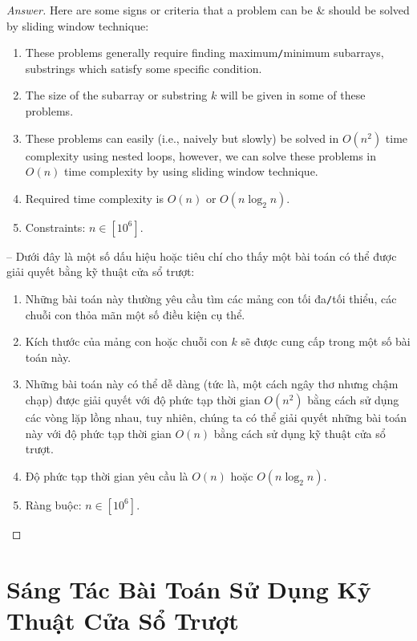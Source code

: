 \documentclass{article}
\begin{document}
\begin{proof}[Answer]
    Here are some signs or criteria that a problem can be \& should be solved by sliding window technique:
    \begin{enumerate}
        \item These problems generally require finding maximum{\tt/}minimum subarrays, substrings which satisfy some specific condition.
        \item The size of the subarray or substring $k$ will be given in some of these problems.
        \item These problems can easily (i.e., naively but slowly) be solved in $O(n^2)$ time complexity using nested loops, however, we can solve these problems in $O(n)$ time complexity by using sliding window technique.
        \item Required time complexity is $O(n)$ or $O(n\log_2n)$.
        \item Constraints: $n\in[10^6]$.
    \end{enumerate}
    -- Dưới đây là một số dấu hiệu hoặc tiêu chí cho thấy một bài toán có thể được giải quyết bằng kỹ thuật cửa sổ trượt:
    \begin{enumerate}
        \item Những bài toán này thường yêu cầu tìm các mảng con tối đa{\tt/}tối thiểu, các chuỗi con thỏa mãn một số điều kiện cụ thể.
        \item Kích thước của mảng con hoặc chuỗi con $k$ sẽ được cung cấp trong một số bài toán này.
        \item Những bài toán này có thể dễ dàng (tức là, một cách ngây thơ nhưng chậm chạp) được giải quyết với độ phức tạp thời gian $O(n^2)$ bằng cách sử dụng các vòng lặp lồng nhau, tuy nhiên, chúng ta có thể giải quyết những bài toán này với độ phức tạp thời gian $O(n)$ bằng cách sử dụng kỹ thuật cửa sổ trượt.
        \item Độ phức tạp thời gian yêu cầu là $O(n)$ hoặc $O(n\log_2n)$.
        \item Ràng buộc: $n\in[10^6]$.
    \end{enumerate}
\end{proof}


\section{Sáng Tác Bài Toán Sử Dụng Kỹ Thuật Cửa Sổ Trượt}
\end{document}
